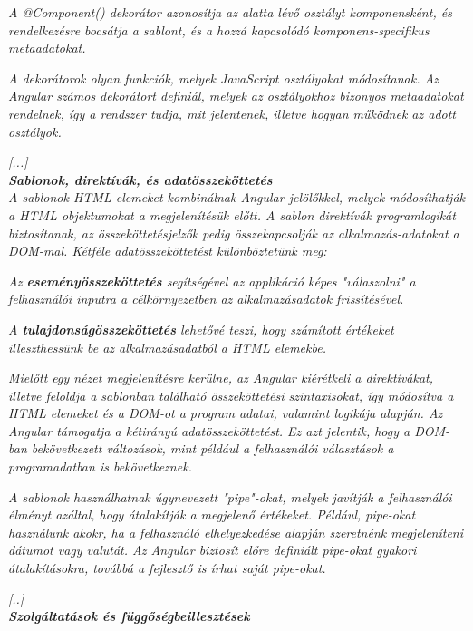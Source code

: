 \textit{A @Component() dekorátor azonosítja az alatta lévő osztályt komponensként, és rendelkezésre bocsátja a sablont, és a hozzá kapcsolódó komponens-specifikus metaadatokat.}

\textit{A dekorátorok olyan funkciók, melyek JavaScript osztályokat módosítanak. Az Angular számos dekorátort definiál, melyek az osztályokhoz bizonyos metaadatokat rendelnek, így a rendszer tudja, mit jelentenek, illetve hogyan működnek az adott osztályok.}

\textit{[...]}\\

\noindent\textit{\textbf{Sablonok, direktívák, és adatösszeköttetés}}\\

\textit{A sablonok HTML elemeket kombinálnak Angular jelölőkkel, melyek módosíthatják a HTML objektumokat a megjelenítésük előtt. A sablon direktívák programlogikát biztosítanak, az összeköttetésjelzők pedig összekapcsolják az alkalmazás-adatokat a DOM-mal. Kétféle adatösszeköttetést különböztetünk meg:}

\textit{Az \textbf{eseményösszeköttetés} segítségével az applikáció képes "válaszolni" a felhasználói inputra a célkörnyezetben az alkalmazásadatok frissítésével.}

\textit{A \textbf{tulajdonságösszeköttetés} lehetővé teszi, hogy számított értékeket illeszthessünk be az alkalmazásadatból a HTML elemekbe.}

\textit{Mielőtt egy nézet megjelenítésre kerülne, az Angular kiérétkeli a direktívákat, illetve feloldja a sablonban található összeköttetési szintaxisokat, így módosítva a HTML elemeket és a DOM-ot a program adatai, valamint logikája alapján. Az Angular támogatja a kétirányú adatösszeköttetést. Ez azt jelentik, hogy a DOM-ban bekövetkezett változások, mint például a felhasználói választások a programadatban is bekövetkeznek.}

\textit{A sablonok használhatnak úgynevezett "pipe"-okat, melyek javítják a felhasználói élményt azáltal, hogy átalakítják a megjelenő értékeket. Például, pipe-okat használunk akokr, ha a felhasználó elhelyezkedése alapján szeretnénk megjeleníteni dátumot vagy valutát. Az Angular biztosít előre definiált pipe-okat gyakori átalakításokra, továbbá a fejlesztő is írhat saját pipe-okat.}

\textit{[..]}\\

\noindent\textit{\textbf{Szolgáltatások és függőségbeillesztések}}\\

